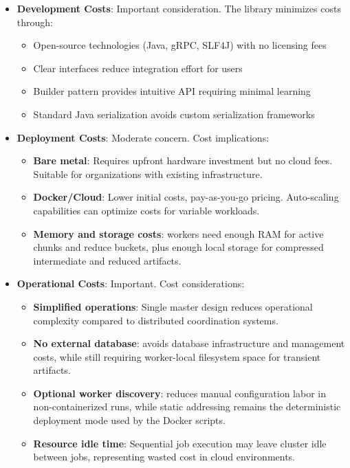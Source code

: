 \documentclass{scrartcl}
\begin{document}
\begin{itemize}
    \item \textbf{Development Costs}: Important consideration. The library minimizes costs through:
          \begin{itemize}
              \item Open-source technologies (Java, gRPC, SLF4J) with no licensing fees
              \item Clear interfaces reduce integration effort for users
              \item Builder pattern provides intuitive API requiring minimal learning
              \item Standard Java serialization avoids custom serialization frameworks
          \end{itemize}

    \item \textbf{Deployment Costs}: Moderate concern. Cost implications:
          \begin{itemize}
              \item \textbf{Bare metal}: Requires upfront hardware investment but no cloud fees. Suitable for organizations with existing infrastructure.
              \item \textbf{Docker/Cloud}: Lower initial costs, pay-as-you-go pricing. Auto-scaling capabilities can optimize costs for variable workloads.
              \item \textbf{Memory and storage costs}: workers need enough RAM for active chunks and reduce buckets, plus enough local storage for compressed intermediate and reduced artifacts.
          \end{itemize}

    \item \textbf{Operational Costs}: Important. Cost considerations:
          \begin{itemize}
              \item \textbf{Simplified operations}: Single master design reduces operational complexity compared to distributed coordination systems.
              \item \textbf{No external database}: avoids database infrastructure and management costs, while still requiring worker-local filesystem space for transient artifacts.
              \item \textbf{Optional worker discovery}: reduces manual configuration labor in non-containerized runs, while static addressing remains the deterministic deployment mode used by the Docker scripts.
              \item \textbf{Resource idle time}: Sequential job execution may leave cluster idle between jobs, representing wasted cost in cloud environments.
          \end{itemize}


\end{itemize}
\end{document}
